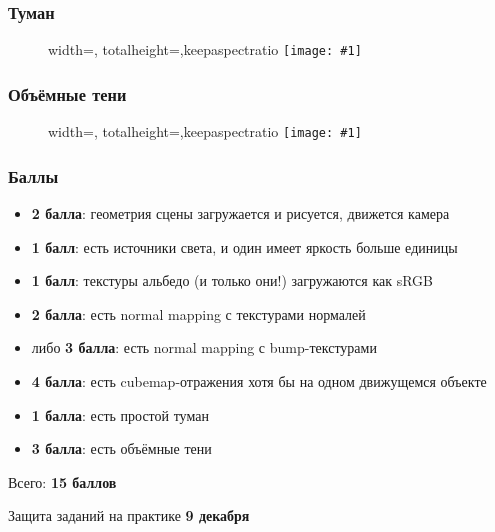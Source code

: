 \documentclass[10pt]{beamer}
\newcommand{\slideimage}[1]{
  \begin{figure}
    \begin{adjustbox}{width=\textwidth, totalheight=\textheight-2\baselineskip-2\baselineskip,keepaspectratio}
      \texttt{[image: \#1]}
    \end{adjustbox}
  \end{figure}
}
\begin{document}
\begin{frame}[fragile]
\frametitle{Туман}
\slideimage{fog.png}
\end{frame}

\begin{frame}[fragile]
\frametitle{Объёмные тени}
\slideimage{volumetric.png}
\end{frame}

\begin{frame}[fragile]
\frametitle{Баллы}
\begin{itemize}
\item \textbf{2 балла}: геометрия сцены загружается и рисуется, движется камера
\item \textbf{1 балл}: есть источники света, и один имеет яркость больше единицы
\item \textbf{1 балл}: текстуры альбедо (и только они!) загружаются как sRGB
\item \textbf{2 балла}: есть normal mapping с текстурами нормалей
\item либо \textbf{3 балла}: есть normal mapping с bump-текстурами
\item \textbf{4 балла}: есть cubemap-отражения хотя бы на одном движущемся объекте
\item \textbf{1 балла}: есть простой туман
\item \textbf{3 балла}: есть объёмные тени
\end{itemize}
Всего: \textbf{15 баллов}

Защита заданий на практике \textbf{9 декабря}
\end{frame}
\end{document}
